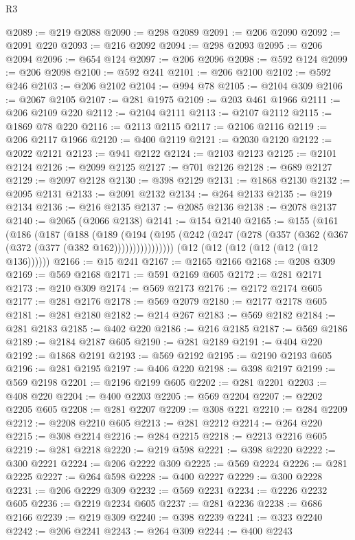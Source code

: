\begin{lexlean}{R3}
\begin{coremodule}
@2089 := @219 @2088
@2090 := @298 @2089
@2091 := @206 @2090
@2092 := @2091 @220
@2093 := @216 @2092
@2094 := @298 @2093
@2095 := @206 @2094
@2096 := @654 @124
@2097 := @206 @2096
@2098 := @592 @124
@2099 := @206 @2098
@2100 := @592 @241
@2101 := @206 @2100
@2102 := @592 @246
@2103 := @206 @2102
@2104 := @994 @78
@2105 := @2104 @309
@2106 := @2067 @2105
@2107 := @281 @1975
@2109 := @203 @461 @1966
@2111 := @206 @2109 @220
@2112 := @2104 @2111
@2113 := @2107 @2112
@2115 := @1869 @78 @220
@2116 := @2113 @2115
@2117 := @2106 @2116
@2119 := @206 @2117 @1966
@2120 := @400 @2119
@2121 := @2030 @2120
@2122 := @2022 @2121
@2123 := @941 @2122
@2124 := @2103 @2123
@2125 := @2101 @2124
@2126 := @2099 @2125
@2127 := @701 @2126
@2128 := @689 @2127
@2129 := @2097 @2128
@2130 := @398 @2129
@2131 := @1868 @2130
@2132 := @2095 @2131
@2133 := @2091 @2132
@2134 := @264 @2133
@2135 := @219 @2134
@2136 := @216 @2135
@2137 := @2085 @2136
@2138 := @2078 @2137
@2140 := @2065 (@2066 @2138)
@2141 := @154 @2140
@2165 := @155
    (@161
      (@186
        (@187
          (@188
            (@189
              (@194 (@195 (@242 (@247 (@278 (@357 (@362 (@367 (@372 (@377 (@382 @162))))))))))))))))
    (@12 (@12 (@12 (@12 (@12 (@12 @136))))))
@2166 := @15 @241
@2167 := @2165 @2166
@2168 := @208 @309
@2169 := @569 @2168
@2171 := @591 @2169 @605
@2172 := @281 @2171
@2173 := @210 @309
@2174 := @569 @2173
@2176 := @2172 @2174 @605
@2177 := @281 @2176
@2178 := @569 @2079
@2180 := @2177 @2178 @605
@2181 := @281 @2180
@2182 := @214 @267
@2183 := @569 @2182
@2184 := @281 @2183
@2185 := @402 @220
@2186 := @216 @2185
@2187 := @569 @2186
@2189 := @2184 @2187 @605
@2190 := @281 @2189
@2191 := @404 @220
@2192 := @1868 @2191
@2193 := @569 @2192
@2195 := @2190 @2193 @605
@2196 := @281 @2195
@2197 := @406 @220
@2198 := @398 @2197
@2199 := @569 @2198
@2201 := @2196 @2199 @605
@2202 := @281 @2201
@2203 := @408 @220
@2204 := @400 @2203
@2205 := @569 @2204
@2207 := @2202 @2205 @605
@2208 := @281 @2207
@2209 := @308 @221
@2210 := @284 @2209
@2212 := @2208 @2210 @605
@2213 := @281 @2212
@2214 := @264 @220
@2215 := @308 @2214
@2216 := @284 @2215
@2218 := @2213 @2216 @605
@2219 := @281 @2218
@2220 := @219 @598
@2221 := @398 @2220
@2222 := @300 @2221
@2224 := @206 @2222 @309
@2225 := @569 @2224
@2226 := @281 @2225
@2227 := @264 @598
@2228 := @400 @2227
@2229 := @300 @2228
@2231 := @206 @2229 @309
@2232 := @569 @2231
@2234 := @2226 @2232 @605
@2236 := @2219 @2234 @605
@2237 := @281 @2236
@2238 := @686 @2166
@2239 := @219 @309
@2240 := @398 @2239
@2241 := @323 @2240
@2242 := @206 @2241
@2243 := @264 @309
@2244 := @400 @2243

\end{coremodule}
\end{lexlean}
